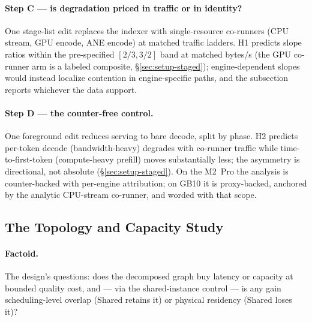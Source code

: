 \paragraph{Step C --- is degradation priced in traffic or in identity?}
One stage-list edit replaces the indexer with single-resource co-runners
(CPU stream, GPU encode, ANE encode) at matched traffic ladders.
 H1 predicts slope ratios within the pre-specified $[2/3, 3/2]$ band at
matched bytes/s (the GPU co-runner arm is a labeled composite,
\S\ref{sec:setup-staged}); engine-dependent slopes would instead
localize contention in engine-specific paths, and the subsection reports
whichever the data support.

\paragraph{Step D --- the counter-free control.} One foreground edit
reduces serving to bare decode, split by phase. H2 predicts per-token
decode (bandwidth-heavy) degrades with co-runner traffic while
time-to-first-token (compute-heavy prefill) moves substantially less; the
asymmetry is directional, not absolute (\S\ref{sec:setup-staged}).
 On the M2~Pro the analysis is
counter-backed with per-engine attribution; on GB10 it is proxy-backed,
anchored by the analytic CPU-stream co-runner, and worded with that scope.

\subsection{The Topology and Capacity Study}
\label{sec:results-topology}

\paragraph{Factoid.}  The design's
questions: does the decomposed graph buy latency or capacity at bounded
quality cost, and --- via the shared-instance control --- is any gain
scheduling-level overlap (Shared retains it) or physical residency
(Shared loses it)?

